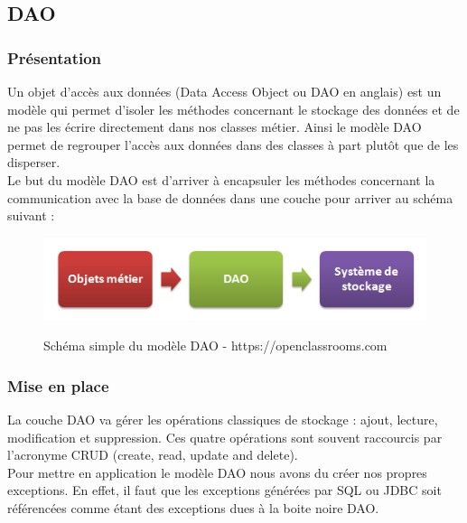 \subsection{DAO}

\subsubsection{Présentation}
Un objet d'accès aux données (Data Access Object ou DAO en anglais) est un modèle qui permet d'isoler les méthodes concernant le stockage des données et de ne pas les écrire directement dans nos classes métier. Ainsi le modèle DAO permet de regrouper l'accès aux données dans des classes à part plutôt que de les disperser. \\

Le but du modèle DAO est d'arriver à encapsuler les méthodes concernant la communication avec la base de données dans une couche pour arriver au schéma suivant :

\begin{figure}[!h]
  \center
  \includegraphics[scale=0.5]{../graph/dao1.png} \\
  \caption{Schéma simple du modèle DAO - https://openclassrooms.com}
\end{figure}

\subsubsection{Mise en place}
La couche DAO va gérer les opérations classiques de stockage : ajout, lecture, modification et suppression. Ces quatre opérations sont souvent raccourcis par l'acronyme CRUD (create, read, update and delete). \\

Pour mettre en application le modèle DAO nous avons du créer nos propres exceptions. En effet, il faut que les exceptions générées par SQL ou JDBC soit référencées comme étant des exceptions dues à la boite noire DAO. 

